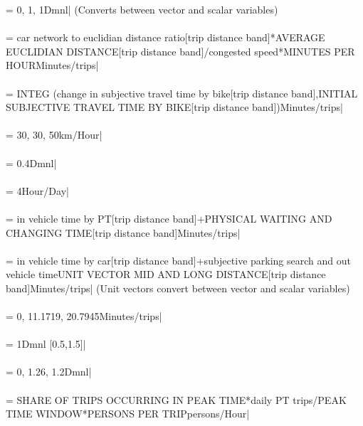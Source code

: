  = 0, 1, 1Dmnl| (Converts between vector and scalar variables) \\ \\ 
 = car network to euclidian distance ratio[trip distance band]*AVERAGE EUCLIDIAN DISTANCE[trip distance band]/congested speed*MINUTES PER HOURMinutes/trips| \\ \\ 
 =  INTEG (change in subjective travel time by bike[trip distance band],INITIAL SUBJECTIVE TRAVEL TIME BY BIKE[trip distance band])Minutes/trips| \\ \\ 
 = 30, 30, 50km/Hour| \\ \\ 
 = 0.4Dmnl| \\ \\ 
 = 4Hour/Day| \\ \\ 
 = in vehicle time by PT[trip distance band]+PHYSICAL WAITING AND CHANGING TIME[trip distance band]Minutes/trips| \\ \\ 
 = in vehicle time by car[trip distance band]+subjective parking search and out vehicle time\*UNIT VECTOR MID AND LONG DISTANCE[trip distance band]Minutes/trips| (Unit vectors convert between vector and scalar variables) \\ \\ 
 = 0, 11.1719, 20.7945Minutes/trips| \\ \\ 
 = 1Dmnl [0.5,1.5]| \\ \\ 
 = 0, 1.26, 1.2Dmnl| \\ \\ 
 = SHARE OF TRIPS OCCURRING IN PEAK TIME*daily PT trips/PEAK TIME WINDOW*PERSONS PER TRIPpersons/Hour| \\ \\ 
